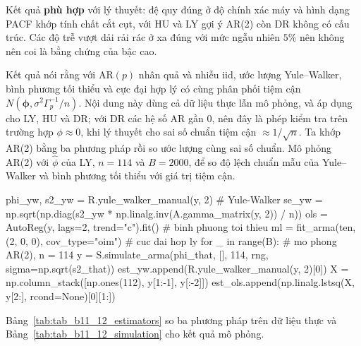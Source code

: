  Kết quả \textbf{phù hợp} với lý thuyết: đệ quy đúng ở độ chính xác máy và hình dạng PACF khớp tính chất cắt cụt, với HU và LY gợi ý AR(2) còn DR không có cấu trúc. Các độ trễ vượt dải rải rác ở xa đúng với mức ngẫu nhiên $5\%$ nên không nên coi là bằng chứng của bậc cao.

 Kết quả  nói rằng với AR$(p)$ nhân quả và nhiễu iid, ước lượng Yule--Walker, bình phương tối thiểu và cực đại hợp lý có cùng phân phối tiệm cận $N(\boldsymbol\phi,\sigma^2\Gamma_p^{-1}/n)$.
 Nội dung này dùng cả dữ liệu thực lẫn mô phỏng, và áp dụng cho LY, HU và DR; với DR các hệ số AR gần $0$, nên đây là phép kiểm tra trên trường hợp $\phi\approx0$, khi lý thuyết cho sai số chuẩn tiệm cận $\approx1/\sqrt n$. Ta khớp AR(2) bằng ba phương pháp rồi so ước lượng cùng sai số chuẩn. Mô phỏng AR(2) với $\hat\phi$ của LY, $n=114$ và $B=2000$, để so độ lệch chuẩn mẫu của Yule--Walker và bình phương tối thiểu với giá trị tiệm cận.
\begin{codeblock}
phi_yw, s2_yw = R.yule_walker_manual(y, 2)                  # Yule-Walker
se_yw = np.sqrt(np.diag(s2_yw * np.linalg.inv(A.gamma_matrix(y, 2)) / n))
ols = AutoReg(y, lags=2, trend="c").fit()                   # binh phuong toi thieu
ml = fit_arma(ten, (2, 0, 0), cov_type="oim")               # cuc dai hop ly
for _ in range(B):                                          # mo phong AR(2), n = 114
    y = S.simulate_arma(phi_that, [], 114, rng, sigma=np.sqrt(s2_that))
    est_yw.append(R.yule_walker_manual(y, 2)[0])
    X = np.column_stack([np.ones(112), y[1:-1], y[:-2]])
    est_ols.append(np.linalg.lstsq(X, y[2:], rcond=None)[0][1:])
\end{codeblock}
 Bảng~\ref{tab:tab_b11_12_estimators} so ba phương pháp trên dữ liệu thực và Bảng~\ref{tab:tab_b11_12_simulation} cho kết quả mô phỏng.
